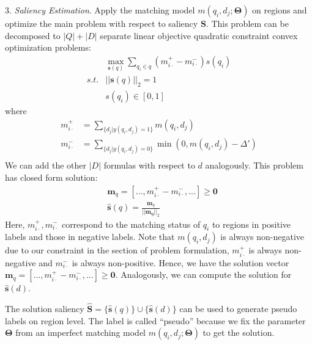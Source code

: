 3. \emph{Saliency Estimation}. Apply the matching model $m(q_i, d_j; \mathbf{\Theta})$ on regions and optimize the main problem with respect to saliency $\mathbf{S}$. This problem can be decomposed to $|Q|+|D|$ separate linear objective quadratic constraint convex optimization problems:
\small
\begin{equation}
\label{eq:decomposed_problem}
\begin{aligned}
& \max_{\mathbf{s}(q)} \sum_{q_i \in q} (m_{i\cdot}^+ - m_{i\cdot}^-) s(q_i) \\
s.t.& ||\mathbf{s}(q)||_2 = 1\\
& s(q_i)\in [0,1]
\end{aligned}
\end{equation}
\normalsize
where
\small
\begin{equation*}
\begin{aligned}
m_{i\cdot}^+& = \sum_{\{d_j|y(q_i,d_j)=1\}} m(q_i,d_j) \\
m_{i\cdot}^-&=\sum_{\{d_j|y(q_i,d_j)=0\}} \min(0, m(q_i,d_j)-\Delta')\\
\end{aligned}
\end{equation*}
\normalsize
We can add the other $|D|$ formulas with respect to $d$ analogously.
This problem has closed form solution:
\small
\begin{equation}
\label{eq:closed_form_solution}
\begin{aligned}
& \mathbf{m}_q = [..., m_{i\cdot }^+ - m_{i\cdot}^-, ...] \geq \mathbf{0} \\
& \hat{\mathbf{s}}(q) = \frac{\mathbf{m}_q}{||\mathbf{m_q}||_2}
\end{aligned}
\end{equation}
\normalsize
Here, $m_{i\cdot }^+, m_{i\cdot}^-$ correspond to the matching status of $q_i$ to regions in positive labels and those in negative labels. 
Note that $m(q_i, d_j)$ is always non-negative due to our constraint in the section of problem formulation, $m_{i\cdot }^+$ is always non-negative and $m_{i\cdot }^-$ is always non-positive. Hence, we have the solution vector  $ \mathbf{m}_q = [..., m_{i\cdot }^+ - m_{i\cdot}^-, ...] \geq \mathbf{0} $. Analogously, we can compute the solution for $\hat{\mathbf{s}}(d)$.

The solution saliency $\hat{\mathbf{S}} = \{\hat{\mathbf{s}}(q)\} \cup \{\hat{\mathbf{s}}(d)\}$ can be used to generate pseudo labels on region level. 
The label is called ``pseudo'' because we fix the parameter $\mathbf{\Theta}$ from an imperfect matching model $m(q_i, d_j; \mathbf{\Theta})$ to get the solution. 


